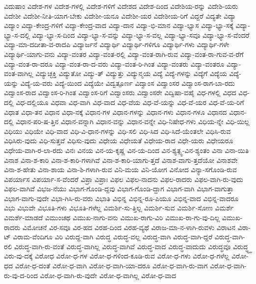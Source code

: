 {ವಿದುಷಾಂ
ವಿದೇಶ-ಗಳ
ವಿದೇಶ-ಗಳಲ್ಲಿ
ವಿದೇಶ-ಗಳಿಗೆ
ವಿದೇಶದ
ವಿದೇಶ-ದಿಂದ
ವಿದೇಶಿಯ-ರನ್ನು
ವಿದೇಶಿ-ಯರು
ವಿದೇಶೀ
ವಿದೇಶೀ-ನೀತಿ-ಯಾಗ-ಬೇಕು
ವಿದೇಶೀ-ಯನೂ
ವಿದೇಶೀ-ಯರ
ವಿದೇಶೀಯ-ರಿಗೆ
ವಿದ್ದರೆ
ವಿದ್ಯತೇ
ವಿದ್ಯಾ
ವಿದ್ಯಾಂ
ವಿದ್ಯಾ-ಕೇಂದ್ರ-ಗಳಿಗೆ
ವಿದ್ಯಾ-ಕೇಂದ್ರ-ವಾದ
ವಿದ್ಯಾ-ದಾನ
ವಿದ್ಯಾ-ಭಿ-ಮಾನ
ವಿದ್ಯಾ-ಭ್ಯಾಸ
ವಿದ್ಯಾ-ಭ್ಯಾ-ಸಕ್ಕೆ
ವಿದ್ಯಾ-ಭ್ಯಾ-ಸ-ದಲ್ಲಿ
ವಿದ್ಯಾ-ಭ್ಯಾ-ಸ-ದಿಂದ
ವಿದ್ಯಾ-ಭ್ಯಾ-ಸ-ವನ್ನು
ವಿದ್ಯಾ-ಭ್ಯಾ-ಸ-ವಲ್ಲ
ವಿದ್ಯಾ-ಭ್ಯಾ-ಸವೂ
ವಿದ್ಯಾ-ಭ್ಯಾ-ಸ-ವೆಂದರೆ
ವಿದ್ಯಾ-ಮಾ-ದದೀತಾ-ವ-ರಾದಪಿ
ವಿದ್ಯಾರ್ಜನೆ
ವಿದ್ಯಾರ್ಥಿ
ವಿದ್ಯಾರ್ಥಿ-ಗಳಿಗೂ
ವಿದ್ಯಾರ್ಥಿ-ಗಳು
ವಿದ್ಯಾರ್ಥಿ-ಗಳೇ
ವಿದ್ಯಾರ್ಥಿ-ಯಾಗು-ವನು
ವಿದ್ಯಾ-ವಂತರ
ವಿದ್ಯಾ-ವಂತ-ರಲ್ಲಿ
ವಿದ್ಯಾ-ವಂತ-ರಾಗಿ-ರುವ
ವಿದ್ಯಾ-ವಂತ-ರಾ-ಗುವ-ವ-ರೆಗೆ
ವಿದ್ಯಾ-ವಂತ-ರಾ-ದರೂ
ವಿದ್ಯಾ-ವಂತ-ರಾ-ದ-ವರು
ವಿದ್ಯಾ-ವಂತ-ರಿ-ಗಿಂತ
ವಿದ್ಯಾ-ವಂತರು
ವಿದ್ಯಾ-ವಂತರೂ
ವಿದ್ಯಾ-ವಂತ-ವಾಗಿಲ್ಲ
ವಿದ್ಯುಚ್ಛಕ್ತಿ
ವಿದ್ಯುತೋ
ವಿದ್ಯು-ತ್
ವಿದ್ಯುತ್ತು
ವಿದ್ಯುನ್ಮಯ
ವಿದ್ಯೆ
ವಿದ್ಯೆ-ಗಳನ್ನು
ವಿದ್ಯೆಗೆ
ವಿದ್ಯೆಯ
ವಿದ್ಯೆ-ಯನ್ನು
ವಿದ್ಯೆ-ಯ-ವರು
ವಿದ್ಯೆ-ಯಿಂದ
ವಿದ್ಯೆಯೇ
ವಿದ್ವತ್ಪೂರ್ಣ
ವಿದ್ವಾಂಸ
ವಿದ್ವಾಂಸರ
ವಿದ್ವಾಂಸ-ರಾಗ-ಬಾ-ರದು
ವಿದ್ವಾಂಸ-ರಾದ
ವಿದ್ವಾಂಸ-ರಿ-ಗಿಂತ
ವಿದ್ವಾಂಸ-ರಿಗೆ
ವಿದ್ವಾಂಸರು
ವಿದ್ವಾಂಸರೇ
ವಿದ್ವಿಷಾ-ವಹೈ
ವಿಧ-ಗಳಲ್ಲಿ
ವಿಧದ
ವಿಧ-ದಲ್ಲಿ
ವಿಧ-ದಲ್ಲಿಯೂ
ವಿಧವಾ
ವಿಧ-ವಾಗಿ
ವಿಧ-ವಾದ
ವಿಧ-ವೆಯ
ವಿಧ-ವೆ-ಯನ್ನು
ವಿಧ-ವೆ-ಯರ
ವಿಧ-ವೆ-ಯ-ರಿಗೆ
ವಿಧಾತ
ವಿಧಾ-ತನ
ವಿಧಾನ
ವಿಧಾ-ನಕ್ಕೆ
ವಿಧಾನ-ಗಳ
ವಿಧಾನ-ಗಳನ್ನು
ವಿಧಾನ-ಗಳು
ವಿಧಾನ-ಗಳೂ
ವಿಧಾನದ
ವಿಧಾನ-ದಲ್ಲಿ
ವಿಧಾನ-ಪರಿ-ಷ-ತ್ತಿನ
ವಿಧಾನ-ವನ್ನಾಗಿ
ವಿಧಾನ-ವನ್ನು
ವಿಧಾನ-ವನ್ನೇ
ವಿಧಿ-ನಿಷೇಧ-ಗಳು
ವಿಧಿಯ-ನ್ನೇ
ವಿಧಿ-ಯಿಲ್ಲ
ವಿಧಿಯು
ವಿಧಿಯೇ
ವಿಧಿ-ವಾದ
ವಿಧಿ-ವಿ-ಧಾನ-ಗಳನ್ನು
ವಿಧಿ-ಸಲಿ
ವಿಧಿ-ಸಿದ
ವಿಧಿ-ಸಿದೆ-ಯೆಂತಲೇ
ವಿಧಿಸಿ-ರುವ
ವಿಧಿಸಿರು-ವುದು
ವಿಧಿ-ಸುತ್ತವೆ
ವಿಧಿಸು-ವುದು
ವಿಧೇಯ
ವಿಧೇಯತೆ
ವಿಧೇಯ-ರಾದ
ವಿಧೇ-ಯರು
ವಿಧೇಯರೂ
ವಿಧೇಯ-ವಾಗಿ-ರ-ಲಾ-ರದು
ವಿನಃ
ವಿನಯ
ವಿನ-ಯ-ಕೃಷ್ಣ
ವಿನ-ಯ-ದಿಂದ
ವಿನ-ಶ್ಯತ್ಸ್ವ-ವಿನ-ಶ್ಯಂತಂ
ವಿನಾ
ವಿನಾ-ಯಿತಿ
ವಿನಾಶ
ವಿನಾ-ಶ-ಕಾರಿ
ವಿನಾ-ಶ-ಕಾರಿ-ಗಳಾಗಿವೆ
ವಿನಾ-ಶ-ಕಾರಿ-ಯಾಗು-ತ್ತದೆ
ವಿನಾಶ-ವಾಗು-ತ್ತದೆಯೋ
ವಿನಾಶವೇ
ವಿನಾ-ಶ-ಹೇತು
ವಿನಾ-ಶಾಯ
ವಿನಾ-ಶಿ-ಗಳಾಗಿ-ರುವ
ವಿನಿ-ಮಯ
ವಿನಿ-ಯೋಗ
ವಿನೋದ
ವಿನ್ಯಾ-ಸಗೊಂಡಿ-ರುವ
ವಿಪರ್ಯಾಸ
ವಿಪರ್ಯಾ-ಸ-ವೆಂದರೆ
ವಿಪ್ರಾ
ವಿಪ್ರಾಃ
ವಿಫಲ
ವಿಫಲ-ನಾದನು
ವಿಫಲ-ರಾದರು
ವಿಫಲ-ವಾಗಿ-ರು-ವುದು
ವಿಫಲ-ವಾಗಿವೆ
ವಿಭಜ-ನೆಯು
ವಿಭಾಗ-ಗೊಂಡಿ-ದ್ದವು
ವಿಭಾಗ-ಗೊಂಡಿ-ದ್ದಾಗ
ವಿಭಾಗ-ವಾಗಿ
ವಿಭಾಗ-ವಾಗುತ್ತಾ
ವಿಭಾಗ-ವಾಗು-ವುದೇ
ವಿಭಾ-ಗಿಸಿ-ರು-ವರು
ವಿಭಾತಿ
ವಿಭಿನ್ನ
ವಿಭಿನ್ನ-ರೂ-ಪಿಯೂ
ವಿಭಿನ್ನ-ವಾದ
ವಿಭಿನ್ನ-ವಾದರೂ
ವಿಭು
ವಿಭುವೇ
ವಿಭೂತಿ-ಗಳು
ವಿಭೂತಿ-ಗಳೆಲ್ಲ
ವಿಮರ್ಶಿ-ಸು-ತ್ತಿಲ್ಲ
ವಿಮರ್ಶಿ-ಸುವ
ವಿಮರ್ಶಿ-ಸೋಣ
ವಿಮರ್ಶೆ
ವಿಮರ್ಶೆ-ಮಾಡದೆ
ವಿಮುಂಚಥ
ವಿಮುಖ-ನಾಗು-ವನು
ವಿಮುಖ-ರಾಗು-ವಿರಿ
ವಿಮುಖ-ರಾ-ಗು-ವು-ದಿಲ್ಲ
ವಿಮುಖ-ರಾದರು
ವಿಮೋಚನೆ
ವಿರ-ಸವೂ
ವಿರ-ಹದ
ವಿರಹ-ದಿಂದ
ವಿರಹ-ವ್ಯಥೆ
ವಿರಾಜ-ಮಾ-ನ-ಳಾಗಿ-ರುವಳು
ವಿರಾಟನ
ವಿರಾ-ಟ್
ವಿರಾಮ-ವೆಂದಿಗೂ
ವಿರಿ
ವಿರುದ್ದ-ವಾಗಿ
ವಿರುದ್ಧ
ವಿರುದ್ಧ-ವಲ್ಲ
ವಿರುದ್ಧ-ವಾಗಿ
ವಿರುದ್ಧ-ವಾಗಿ-ದ್ದರೆ
ವಿರುದ್ಧ-ವಾಗಿ-ರಲಿ
ವಿರುದ್ಧ-ವಾಗಿ-ರು-ವಂತೆ
ವಿರುದ್ಧ-ವಾಗಿಲ್ಲ
ವಿರುದ್ಧ-ವಾಗಿವೆ
ವಿರುದ್ಧ-ವಾದ
ವಿರುದ್ಧ-ವಾದುದು
ವಿರುದ್ಧವೂ
ವಿರುದ್ಧ್ಧ್ದ
ವಿರು-ವು-ದಕ್ಕೆ
ವಿರೋಧ
ವಿರೋ-ಧ-ಗಳ
ವಿರೋ-ಧ-ಗಳಿಂದ-ಕೂಡಿ-ರುವ
ವಿರೋ-ಧ-ಗಳು
ವಿರೋ-ಧ-ಗಳೆಲ್ಲ
ವಿರೋ-ಧದ
ವಿರೋ-ಧ-ದಂತೆ
ವಿರೋ-ಧ-ವಾಗಿ
ವಿರೋ-ಧ-ವಾಗಿ-ಯಾ-ದರೂ
ವಿರೋ-ಧ-ವಾಗಿ-ರು-ವಾಗ
ವಿರೋ-ಧ-ವಾಗಿ-ರು-ವು-ದ-ರಿಂದ
ವಿರೋ-ಧ-ವಾಗಿ-ರು-ವುದೇ
ವಿರೋ-ಧ-ವಾಗಿಲ್ಲ
ವಿರೋ-ಧ-ವಾದ
}
